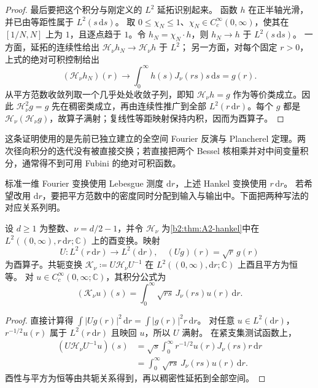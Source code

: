 \begin{proof}
最后要把这个积分与刚定义的 \(L^2\) 延拓识别起来。
函数 \(h\) 在正半轴光滑，并已由等距性属于 \(L^2(s\,\mathrm ds)\)。
取 \(0\le\chi_N\le1\)、\(\chi_N\in C_c^\infty(0,\infty)\)，使其在
\([1/N,N]\) 上为 \(1\)，且逐点趋于 \(1\)。令
\(h_N=\chi_N\cdot h\)，则 \(h_N\to h\) 于 \(L^2(s\,\mathrm ds)\)。
一方面，延拓的连续性给出
\(\mathcal H_\nu h_N\to\mathcal H_\nu h\) 于 \(L^2\)；
另一方面，对每个固定 \(r>0\)，上式的绝对可积控制给出
\[
 (\mathcal H_\nu h_N)(r)
 \longrightarrow\int_0^\infty h(s)J_\nu(rs)s\,\mathrm ds=g(r).
\]
从平方范数收敛列取一个几乎处处收敛子列，即知
\(\mathcal H_\nu h=g\) 作为等价类成立。因此
\(\mathcal H_\nu^2g=g\) 先在稠密类成立，再由连续性推广到全部
\(L^2(r\,\mathrm dr)\)。每个 \(g\) 都是
\(\mathcal H_\nu(\mathcal H_\nu g)\)，故算子满射；复线性等距映射保持内积，因而为酉算子。
\end{proof}

这条证明使用的是先前已独立建立的全空间 Fourier 反演与
Plancherel 定理。两次径向积分的迭代没有被直接交换；若直接把两个
Bessel 核相乘并对中间变量积分，通常得不到可用 Fubini 的绝对可积函数。

\ProseParagraphBreak

标准一维 Fourier 变换使用 Lebesgue 测度
\(\mathrm dr\)，上述 Hankel 变换使用 \(r\,\mathrm dr\)。
若希望改用 \(\mathrm dr\)，要把平方范数中的密度同时分配到输入与输出中。下面把两种写法的对应关系列明。

\begin{proposition}
\label{b2:prop:A2-hankel-lebesgue}
设 \(d\ge1\) 为整数、\(\nu=d/2-1\)，并令
\(\mathcal H_\nu\) 为\cref{b2:thm:A2-hankel}中在
\(L^2((0,\infty),r\,\mathrm dr;\mathbb C)\) 上的酉变换。映射
\[
 U:L^2(r\,\mathrm dr)\longrightarrow L^2(\mathrm dr),
 \quad (Ug)(r)=\sqrt r\,g(r)
\]
为酉算子。共轭变换
\(\mathcal K_\nu\coloneqq U\mathcal H_\nu U^{-1}\)
在 \(L^2((0,\infty),\mathrm dr;\mathbb C)\) 上酉且平方为恒等。
对 \(u\in C_c^\infty(0,\infty;\mathbb C)\)，其积分公式为
\[
 (\mathcal K_\nu u)(s)
 =\int_0^\infty \sqrt{rs}\,J_\nu(rs)u(r)\,\mathrm dr.
\]
\end{proposition}
\begin{proof}
直接计算得
\(\int|Ug(r)|^2\,\mathrm dr=\int|g(r)|^2r\,\mathrm dr\)。
对任意 \(u\in L^2(\mathrm dr)\)，\(r^{-1/2}u(r)\) 属于
\(L^2(r\,\mathrm dr)\) 且映回 \(u\)，所以 \(U\) 满射。
在紧支集测试函数上，
\[
\begin{aligned}
 (U\mathcal H_\nu U^{-1}u)(s)
 &=\sqrt s\int_0^\infty
       r^{-1/2}u(r)J_\nu(rs)r\,\mathrm dr\\
 &=\int_0^\infty \sqrt{rs}\,J_\nu(rs)u(r)\,\mathrm dr.
\end{aligned}
\]
酉性与平方为恒等由共轭关系得到，再以稠密性延拓到全部空间。
\end{proof}


